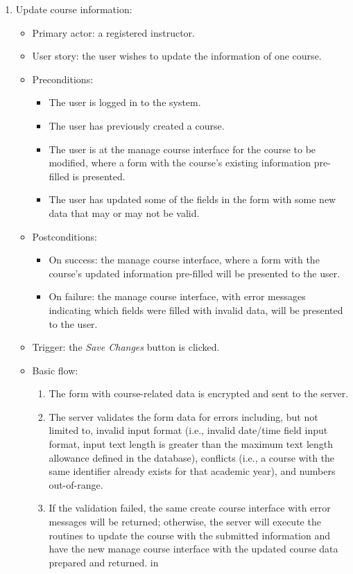 \begin{enumerate}
\item Update course information:
\begin{itemize}
    \item Primary actor: a registered instructor.
    \item User story: the user wishes to update the information of one course.
        \baselineskip
    \item Preconditions:
        \begin{itemize}
            \item The user is logged in to the system.
            \item The user has previously created a course.
            \item The user is at the manage course interface for the course to
                be modified, where a form with
                the course's existing information pre-filled is presented.
            \item The user has updated some of the fields in the form with some
                new data that may or may not be valid.
        \end{itemize}
    \item Postconditions:
        \begin{itemize}
            \item On success: the manage course interface, where a form with
                the course's updated information pre-filled will be presented
                to the user.
            \item On failure: the manage course interface, with error messages
                indicating which fields were filled with invalid data, will be
                presented to the user.
        \end{itemize}
    \item Trigger: the \emph{Save Changes} button is clicked.
    \item Basic flow:
        \begin{enumerate}
            \item The form with course-related data is encrypted and sent to
                the server.
            \item The server validates the form data for errors including,
                but not limited to,
                invalid input format
                (i.e., invalid date/time field input format,
                input text length is greater than the maximum text length
                allowance defined in the database),
                conflicts (i.e., a course with the same identifier  
                already exists for that academic year),
                and numbers out-of-range.
            \item If the validation failed, the same create course interface
                with error messages will be returned; otherwise, the server will
                execute the routines to update the course with the submitted 
                information and have the new manage course interface with the
                updated course data prepared and returned.
             in
        \end{enumerate}
\end{itemize}


\end{enumerate}
